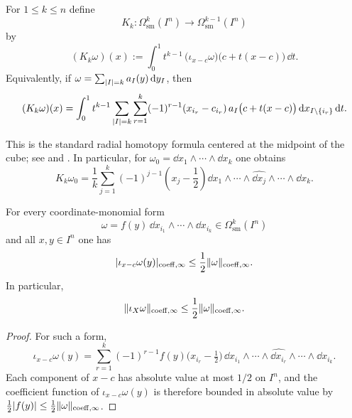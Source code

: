 \begin{definition}
\label{def:homotopy-operator}
For $1\le k\le n$ define
\[
K_k:\Omega^k_{\mathrm{sm}}(I^n)\to \Omega^{k-1}_{\mathrm{sm}}(I^n)
\]
by
\begin{equation}
\label{eq:homotopy-operator}
(K_k\omega)(x)
:=
\int_0^1 t^{k-1}\,\bigl(\iota_{x-c}\omega\bigr)\!\bigl(c+t(x-c)\bigr)\,\dd t.
\end{equation}
Equivalently, if
$\omega=\sum_{\lvert I \rvert=k}a_I(y)\,\mathrm{d} y_I$, then
\begin{equation}
\label{eq:homotopy-operator-explicit}
(K_k\omega)(x)
=
\int_0^1 t^{k-1}
\sum_{\lvert I \rvert=k}\sum_{r=1}^k (-1)^{r-1}(x_{i_r}-c_{i_r})\,
a_I\bigl(c+t(x-c)\bigr)\,
\mathrm{d} x_{I\setminus\{i_r\}}\,\mathrm{d} t.
\end{equation}
\end{definition}

This is the standard radial homotopy formula centered at the midpoint of the
cube; see \cite[Sec.~3]{BottTu1982} and
\cite{Dupont1976,DupontBook1978,Albert2020}. In particular, for
$\omega_0=\dd x_1\wedge\cdots\wedge \dd x_k$ one obtains
\begin{equation}
\label{eq:explicit-minimizer}
K_k\omega_0
=
\frac{1}{k}\sum_{j=1}^k (-1)^{j-1}\left(x_j-\frac12\right)
\dd x_1\wedge\cdots\wedge\widehat{\dd x_j}\wedge\cdots\wedge \dd x_k.
\end{equation}

\begin{lemma}
\label{lem:contraction-estimate}
For every coordinate-monomial form
\[
\omega=f(y)\,\dd x_{i_1}\wedge\cdots\wedge \dd x_{i_k}
\in \Omega^k_{\mathrm{sm}}(I^n)
\]
and all $x,y\in I^n$ one has
\[
\lvert \iota_{x-c}\omega(y) \rvert_{\mathrm{coeff},\infty}\le
\frac12\lVert \omega \rVert_{\mathrm{coeff},\infty}.
\]
In particular,
\[
\lVert \iota_X\omega \rVert_{\mathrm{coeff},\infty}\le \frac12\lVert \omega \rVert_{\mathrm{coeff},\infty}.
\]
\end{lemma}

\begin{proof}
For such a form,
\[
\iota_{x-c}\omega(y)=
\sum_{r=1}^k (-1)^{r-1} f(y)\bigl(x_{i_r}-\tfrac12\bigr)\,
\dd x_{i_1}\wedge\cdots\wedge\widehat{\dd x_{i_r}}\wedge\cdots\wedge
\dd x_{i_k}.
\]
Each component of $x-c$ has absolute value at most $1/2$ on $I^n$, and the
coefficient function of $\iota_{x-c}\omega(y)$ is therefore bounded in absolute
value by $\frac12\lvert f(y) \rvert\le \frac12\lVert \omega \rVert_{\mathrm{coeff},\infty}$.
\end{proof}

